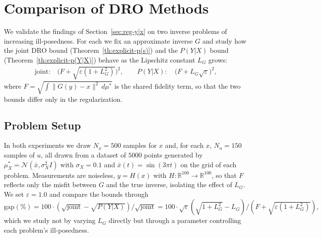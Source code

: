 \documentclass{article}
\theoremstyle{definition}
\theoremstyle{remarksty}
\begin{document}
\section{Comparison of DRO Methods}\label{sec:comparison}
We validate the findings of Section~\ref{sec:reg-y|x} on two inverse problems of increasing ill-posedness. For each we fix an approximate inverse $G$ and study how the joint DRO bound (Theorem~\ref{th:explicit-p(s)}) and the $P(Y|X)$ bound (Theorem~\ref{th:explicit-p(Y|X)}) behave as the Lipschitz constant $L_G$ grows:
\begin{align*}
    \text{joint:}\quad \Big(F + \sqrt{\varepsilon(1+L_G^2)}\Big)^2, \qquad
    P(Y|X):\quad \Big(F + L_G\sqrt{\varepsilon}\Big)^2,
\end{align*}
where $F = \sqrt{\int\|G(y)-x\|^2\,d\mu^*}$ is the shared fidelity term, so that the two bounds differ only in the regularization.

\subsection{Problem Setup}
In both experiments we draw $N_x = 500$ samples for $x$ and, for each $x$, $N_u = 150$ samples of $u$, all drawn from a dataset of $5000$ points generated by $\mu_X^* = \mathcal{N}(\bar x, \sigma_X^2 I)$ with $\sigma_X = 0.1$ and $\bar x(t) = \sin(3\pi t)$ on the grid of each problem. Measurements are noiseless, $y = H(x)$ with $H : \mathbb{R}^{100} \to \mathbb{R}^{100}$, so that $F$ reflects only the misfit between $G$ and the true inverse, isolating the effect of $L_G$. We set $\varepsilon = 1.0$ and compare the bounds through $\text{gap}(\%) = 100 \cdot (\sqrt{\text{joint}}-\sqrt{P(Y|X)})/\sqrt{\text{joint}} = 100 \cdot \sqrt{\varepsilon}\left(\sqrt{1+L_G^2} - L_G\right)/(F + \sqrt{\varepsilon(1+L_G^2)}),$ which we study not by varying $L_G$ directly but through a parameter controlling each problem's ill-posedness.

\end{document}
